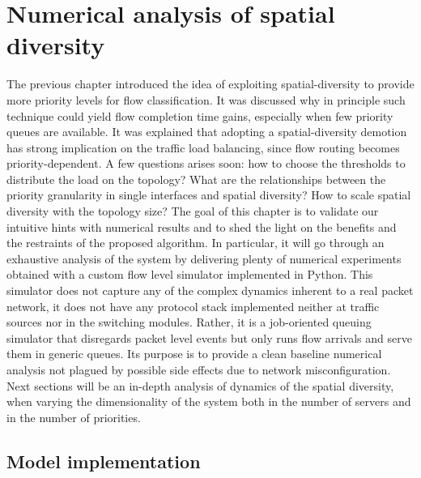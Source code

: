 \chapter{Numerical analysis of spatial diversity}
\label{ch:numerical-simulator}
The previous chapter introduced the idea of exploiting spatial-diversity to provide more priority levels for flow classification. It was discussed why in principle such technique could yield flow completion time gains, especially when few priority queues are available. It was explained that adopting a spatial-diversity demotion has strong implication on the traffic load balancing, since flow routing becomes priority-dependent.  A few questions arises soon: how to choose the thresholds to distribute the load on the topology? What are the relationships between the priority granularity in 
single interfaces and spatial diversity? How to scale spatial diversity with the topology size? The goal of this chapter is to validate our intuitive hints with numerical results and to shed the light on the benefits and the restraints of the proposed algorithm. In particular, it will go through an exhaustive analysis of the system by delivering plenty of numerical experiments obtained with a custom flow level simulator implemented in Python. This simulator does not capture any of the complex dynamics inherent to a real packet network, it does not have any protocol stack implemented neither at traffic sources nor in the switching modules. Rather, it is a job-oriented queuing simulator that disregards packet level events but only runs flow arrivals and serve them in generic queues. Its purpose is to provide a clean baseline numerical analysis not plagued by possible side effects due to network misconfiguration.
Next sections will be an in-depth analysis of dynamics of the spatial diversity, when varying the dimensionality of the system both in the number of servers and in the number of priorities.
\section{Model implementation}


